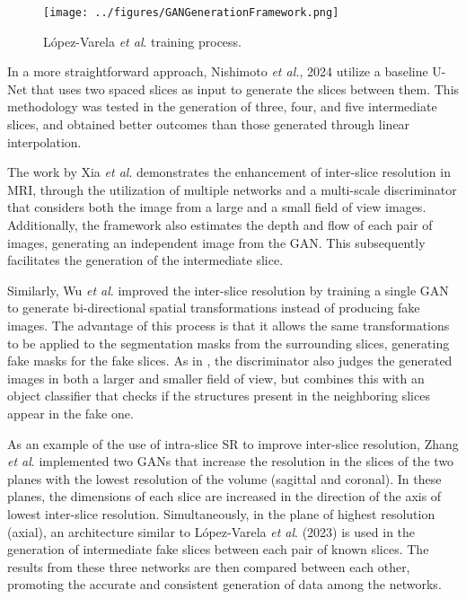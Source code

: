 \begin{figure}[!ht]
	\centering
	\texttt{[image: ../figures/GANGenerationFramework.png]}
	\caption{López-Varela \textit{et al}. \cite{Lopez2023} training process.}
	\label{fig:GANGenerationFramework}
\end{figure}

In a more straightforward approach, Nishimoto \textit{et al.}, 2024 \cite{Nishimoto2024} utilize a baseline U-Net that uses two spaced slices as input to generate the slices between them. This methodology was tested in the generation of three, four, and five intermediate slices, and obtained better outcomes than those generated through linear interpolation.
\par
The work by Xia \textit{et al}. \cite{Xia2021} demonstrates the enhancement of inter-slice resolution in MRI, through the utilization of multiple networks and a multi-scale discriminator that considers both the image from a large and a small field of view images. Additionally, the framework also estimates the depth and flow of each pair of images, generating an independent image from the GAN. This subsequently facilitates the generation of the intermediate slice.
\par
Similarly, Wu \textit{et al}. \cite{Wu2022} improved the inter-slice resolution by training a single GAN to generate bi-directional spatial transformations instead of producing fake images. The advantage of this process is that it allows the same transformations to be applied to the segmentation masks from the surrounding slices, generating fake masks for the fake slices. As in \cite{Xia2021}, the discriminator also judges the generated images in both a larger and smaller field of view, but combines this with an object classifier that checks if the structures present in the neighboring slices appear in the fake one.
\par
As an example of the use of intra-slice SR to improve inter-slice resolution, Zhang \textit{et al}. \cite{Zhang2024} implemented two GANs that increase the resolution in the slices of the two planes with the lowest resolution of the volume (sagittal and coronal). In these planes, the dimensions of each slice are increased in the direction of the axis of lowest inter-slice resolution. Simultaneously, in the plane of highest resolution (axial), an architecture similar to López-Varela \textit{et al}. (2023) \cite{Lopez2023} is used in the generation of intermediate fake slices between each pair of known slices. The results from these three networks are then compared between each other, promoting the accurate and consistent generation of data among the networks.
